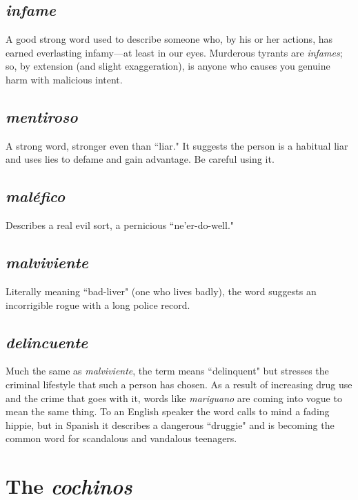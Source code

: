 \subsection{\emph{infame}}

A good strong word used to describe someone who,
by his or her actions, has earned everlasting infamy---at least in our
eyes. Murderous tyrants are \emph{infames}; so, by extension (and slight exaggeration), is anyone who causes you genuine harm with malicious
intent.

\subsection{\emph{mentiroso}}

A strong word, stronger even than ``liar." It suggests the person is a habitual liar and uses lies to defame and gain advantage. Be careful using it.

\subsection{\emph{maléfico}}

Describes a real evil sort, a pernicious ``ne'er-do-well."

\subsection{\emph{malviviente}}

Literally meaning ``bad-liver" (one who lives
badly), the word suggests an incorrigible rogue with a long police
record.

\subsection{\emph{delincuente}}

Much the same as \emph{malviviente}, the term
means ``delinquent" but stresses the criminal lifestyle that such a person has chosen. As a result of increasing drug use and the crime that
goes with it, words like \emph{mariguano} are coming into vogue to mean the
same thing. To an English speaker the word calls to mind a fading hippie, but in Spanish it describes a dangerous ``druggie" and is becoming
the common word for scandalous and vandalous teenagers.

\section{The \emph{cochinos}}


